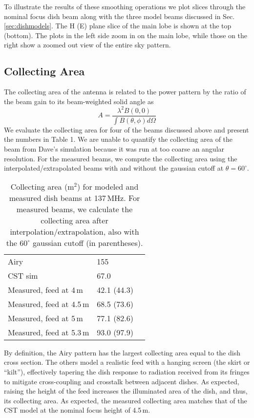 \documentclass{emulateapj}
\begin{document}
To illustrate the results of these smoothing operations we plot slices through the nominal focus dish beam along with the three model beams discussed in Sec. \ref{sec:dishmodels}. The H (E) plane slice of the main lobe is shown at the top (bottom). The plots in the left side zoom in on the main lobe, while those on the right show a zoomed out view of the entire sky pattern. 

\subsection{Collecting Area}

The collecting area of the antenna is related to the power pattern by the ratio of the beam gain to its beam-weighted solid angle as
\begin{equation}
	A=\frac{\lambda^2 B(0,0)}{\int B(\theta,\phi)d\Omega}
\end{equation}
We evaluate the collecting area for four of the beams discussed above and present the numbers in Table 1. We are unable to quantify the collecting area of the beam from Dave's simulation because it was run at too coarse an angular resolution. For the measured beams, we compute the collecting area using the interpolated/extrapolated beams with and without the gaussian cutoff at $\theta=60^\circ$.

 \begin{table}[h]
 \caption{ \label{table:collectingareatable}Collecting area (m$^2$) for modeled and measured dish beams at 137\,MHz. For measured beams, we calculate the collecting area after interpolation/extrapolation, also with the $60^\circ$ gaussian cutoff (in parentheses).}
\begin{tabular}{| l | l | l |}
\hline
  Airy & 155\,  \\
  CST sim & 67.0\,  \\
  \hline
  Measured, feed at 4\,m & 42.1 (44.3) \\
  Measured, feed at 4.5\,m & 68.5 (73.6) \\ 
  Measured, feed at 5\,m & 77.1 (82.6) \\
  Measured, feed at 5.3\,m & 93.0 (97.9)\\
  \hline
\end{tabular}
\end{table}

By definition, the Airy pattern has the largest collecting area equal to the dish cross section. The others model a realistic feed with a hanging screen (the skirt or ``kilt''), effectively tapering the dish response to radiation received from its fringes to mitigate cross-coupling and crosstalk between adjacent dishes. As expected, raising the height of the feed increases the illuminated area of the dish, and thus, its collecting area. As expected, the measured collecting area matches that of the CST model at the nominal focus height of 4.5\,m.
\end{document}
